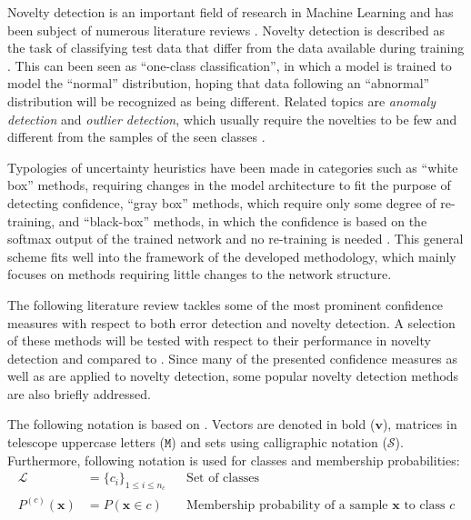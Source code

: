 \documentclass[10pt]{article}
\begin{document}
Novelty detection is an important field of research in Machine Learning and has been subject of numerous literature reviews \cite{Bishop1994NoveltyDA, Markou2003NoveltyDApt1,Markou2003NoveltyDApt2,Pimentel2014ARO, deMorsier2014thesis}. Novelty detection is described as the task of classifying test data that differ from the data available during training \cite{Pimentel2014ARO}. This can been seen as ``one-class classification'', in which a model is trained to model the ``normal'' distribution, hoping that data following an ``abnormal'' distribution will be recognized as being different. Related topics are  \textit{anomaly detection} and \textit{outlier detection}, which usually require the novelties to be few and different from the samples of the seen classes \cite{deMorsier2014thesis, Pimentel2014ARO}.

Typologies of uncertainty heuristics have been made in categories such as ``white box'' methods, requiring changes in the model architecture to fit the purpose of detecting confidence, ``gray box'' methods, which require only some degree of re-training, and ``black-box'' methods, in which the confidence is based on the softmax output of the trained network and no re-training is needed \cite{Bahat_2018}. This general scheme fits well into the framework of the developed methodology, which mainly focuses on methods requiring little changes to the network structure.

The following literature review tackles some of the most prominent confidence measures with respect to both error detection and novelty detection. A selection of these methods will be tested with respect to their performance in novelty detection and compared to . Since many of the  presented confidence measures as well as  are applied to novelty detection, some popular novelty detection methods are also briefly addressed.

The following notation is based on \cite{decisionForests-MSR}. Vectors are denoted in bold ($\mathbf{v}$), matrices in telescope uppercase letters ($\mathtt{M}$) and sets using calligraphic notation ($\mathcal{S}$). Furthermore, following notation is used for classes and membership probabilities:
\begin{align}
\mathcal{L}&=\{c_i\}_{1\leq i\leq n_c}&& \text{Set of classes}\\
P^{(c)}(\mathbf{x})&=P(\mathbf{x}\in c)&& \text{Membership probability of a sample } \mathbf{x} \text{ to class }c
\end{align}
\end{document}
